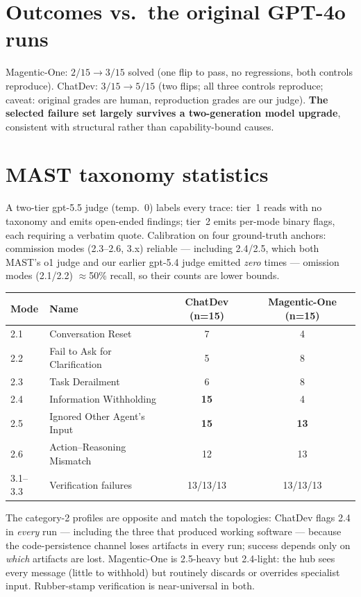 \documentclass[10pt]{article}
\begin{document}
\section{Outcomes vs.\ the original GPT-4o runs}
Magentic-One: $2/15 \rightarrow 3/15$ solved (one flip to pass, no
regressions, both controls reproduce). ChatDev: $3/15 \rightarrow 5/15$ (two
flips; all three controls reproduce; caveat: original grades are human,
reproduction grades are our judge). \textbf{The selected failure set largely
survives a two-generation model upgrade}, consistent with structural rather
than capability-bound causes.

\section{MAST taxonomy statistics}
A two-tier gpt-5.5 judge (temp.~0) labels every trace: tier~1 reads with no
taxonomy and emits open-ended findings; tier~2 emits per-mode binary flags,
each requiring a verbatim quote. Calibration on four ground-truth anchors:
commission modes (2.3--2.6, 3.x) reliable --- including 2.4/2.5, which both
MAST's o1 judge and our earlier gpt-5.4 judge emitted \emph{zero} times ---
omission modes (2.1/2.2) $\approx$50\% recall, so their counts are lower
bounds.

\begin{center}\small
\begin{tabular}{llcc}\toprule
Mode & Name & ChatDev (n=15) & Magentic-One (n=15)\\\midrule
2.1 & Conversation Reset & 7 & 4\\
2.2 & Fail to Ask for Clarification & 5 & 8\\
2.3 & Task Derailment & 6 & 8\\
2.4 & Information Withholding & \textbf{15} & 4\\
2.5 & Ignored Other Agent's Input & \textbf{15} & \textbf{13}\\
2.6 & Action--Reasoning Mismatch & 12 & 13\\
3.1--3.3 & Verification failures & 13/13/13 & 13/13/13\\
\bottomrule
\end{tabular}
\end{center}

The category-2 profiles are opposite and match the topologies: ChatDev flags
2.4 in \emph{every} run --- including the three that produced working
software --- because the code-persistence channel loses artifacts in every
run; success depends only on \emph{which} artifacts are lost. Magentic-One is
2.5-heavy but 2.4-light: the hub sees every message (little to withhold) but
routinely discards or overrides specialist input. Rubber-stamp verification
is near-universal in both.
\end{document}
